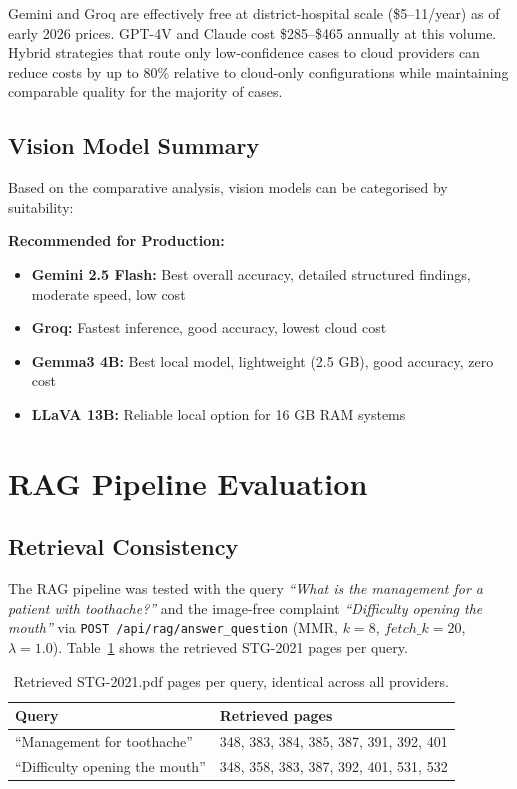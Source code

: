 \documentclass[12pt,a4paper]{report}
\begin{document}
	Gemini and Groq are effectively free at district-hospital scale (\$5--11/year) as of early 2026 prices.
	GPT-4V and Claude cost \$285--\$465 annually at this volume. Hybrid strategies
	that route only low-confidence cases to cloud providers can reduce costs by up
	to 80\% relative to cloud-only configurations while maintaining comparable
	quality for the majority of cases.
	
	\subsection{Vision Model Summary}
	
	Based on the comparative analysis, vision models can be categorised by suitability:
	
	\textbf{Recommended for Production:}
	\begin{itemize}
		\item \textbf{Gemini 2.5 Flash:} Best overall accuracy, detailed structured findings, moderate speed, low cost
		\item \textbf{Groq:} Fastest inference, good accuracy, lowest cloud cost
		\item \textbf{Gemma3 4B:} Best local model, lightweight (2.5 GB), good accuracy, zero cost
		\item \textbf{LLaVA 13B:} Reliable local option for 16 GB RAM systems
	\end{itemize}
	
	
	\section{RAG Pipeline Evaluation}
	\label{sec:results_rag}
	
	\subsection{Retrieval Consistency}
	
	The RAG pipeline was tested with the query \textit{``What is the management for a
		patient with toothache?''} and the image-free complaint \textit{``Difficulty opening
		the mouth''} via \texttt{POST /api/rag/answer\_question} (MMR, $k{=}8$,
	$\mathit{fetch\_k}{=}20$, $\lambda{=}1.0$). Table~\ref{tab:retrieval_consistency}
	shows the retrieved STG-2021 pages per query.
	
	\begin{table}[H]
		\centering
		\caption{Retrieved STG-2021.pdf pages per query, identical across all providers.}
		\label{tab:retrieval_consistency}
		\small
		\renewcommand{\arraystretch}{1.2}
		\begin{tabularx}{\textwidth}{@{}l X@{}}
			\toprule
			\textbf{Query} & \textbf{Retrieved pages} \\
			\midrule
			``Management for toothache'' & 348, 383, 384, 385, 387, 391, 392, 401 \\
			``Difficulty opening the mouth'' & 348, 358, 383, 387, 392, 401, 531, 532 \\
			\bottomrule
		\end{tabularx}
	\end{table}
	
\end{document}
